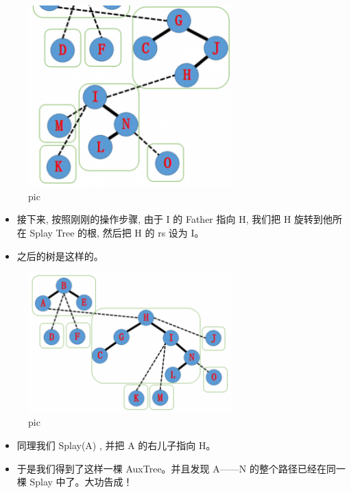 \begin{figure}[htbp]
\centering
\includegraphics[width=0.7\textwidth]{docs/ds/images/lct8.png} 
\caption{pic}
\end{figure}

\begin{itemize}
\item 接下来, 按照刚刚的操作步骤, 由于 I 的 Father 指向 H, 我们把 H 旋转到他所在 Splay Tree 的根, 然后把 H 的 rs 设为 I。
\item 之后的树是这样的。
\end{itemize}

\begin{figure}[htbp]
\centering
\includegraphics[width=0.7\textwidth]{docs/ds/images/lct6.png} 
\caption{pic}
\end{figure}

\begin{itemize}
\item 同理我们 Splay(A) , 并把 A 的右儿子指向 H。
\item 于是我们得到了这样一棵 AuxTree。并且发现 A——N 的整个路径已经在同一棵 Splay 中了。大功告成！
\end{itemize}

